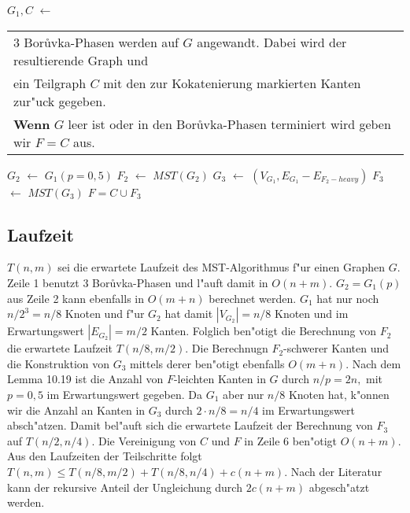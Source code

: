 \begin{algorithm}
\begin{algorithmic}[1]
    \STATE $G_1, C$ $\leftarrow$\begin{tabular}[H]{l}
                                 3 Bor\r uvka-Phasen werden auf $G$ angewandt.
                                 Dabei wird der resultierende Graph und\\
                                 ein Teilgraph $C$ mit den zur
                                 Kokatenierung markierten Kanten zur"uck gegeben.\\
                                 \textbf{Wenn} $G$ leer ist oder in den Bor\r uvka-Phasen
                                 terminiert wird geben wir $F=C$ aus.\\
                                 \end{tabular}
    \STATE $G_2$ $\leftarrow$ $G_1(p=0,5)$
    \STATE $F_2$ $\leftarrow$ $MST(G_2)$
    \STATE $G_3$ $\leftarrow$ $(V_{G_1}, E_{G_1} - E_{F_2-heavy})$
    \STATE $F_3$ $\leftarrow$ $MST(G_3)$
    \RETURN $F = C \cup F_3$
\end{algorithmic}
\end{algorithm}

\subsection{Laufzeit}

$T(n,m)$ sei die erwartete Laufzeit des MST-Algorithmus f"ur einen Graphen $G$.
    Zeile 1 benutzt 3 Bor\r uvka-Phasen und  l"auft damit in $O(n+m)$. 
    $G_2 = G_1(p)$ aus Zeile 2 kann ebenfalls in $O(m + n)$ berechnet werden.
    $G_1$ hat nur noch $n/2^3 = n/8$ Knoten und f"ur $G_2$ hat damit 
    $|V_{G_2}| = n/8$ Knoten und im Erwartungswert $|E_{G_2}| = m/2$ Kanten.
    Folglich ben"otigt die Berechnung von $F_2$  die erwartete Laufzeit 
    $T(n/8,m/2)$.
    Die Berechnugn $F_2$-schwerer Kanten und die Konstruktion von $G_3$ mittels
    derer ben"otigt ebenfalls $O(m+n)$.
    Nach dem Lemma 10.19 \cite{randAlg} ist die Anzahl von $F$-leichten Kanten in $G$ durch
    $n/p = 2n,$ mit $p = 0,5$ im Erwartungswert gegeben. Da $G_1$
    aber nur $n/8$ Knoten hat, k"onnen wir die Anzahl an Kanten in $G_3$
    durch $2 \cdot n/8 = n/4$ im Erwartungswert absch"atzen.
    Damit bel"auft sich die erwartete Laufzeit der Berechnung von $F_3$ auf
    $T(n/2, n/4)$.
    Die Vereinigung von $C$ und $F$ in Zeile 6 ben"otigt $O(n+m)$.\\
Aus den Laufzeiten der Teilschritte folgt
    $T(n,m) \leq T(n/8, m/2) + T(n/8, n/4) + c(n+m)$.
    Nach der Literatur kann der rekursive Anteil der Ungleichung durch $2c(n+m)$ 
    abgesch"atzt werden.
    \\
